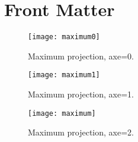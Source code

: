 \documentclass{InsightArticle}
\title{}
\author{}
\begin{document}
\maketitle

\ifhtml
\chapter*{Front Matter\label{front}}
\fi


\begin{abstract}
\noindent
\end{abstract}

\tableofcontents







\begin{figure}[htbp]
\centering
\texttt{[image: maximum0]}
\caption{Maximum projection, axe=0.}
\end{figure}

\begin{figure}[htbp]
\centering
\texttt{[image: maximum1]}
\caption{Maximum projection, axe=1.}
\end{figure}

\begin{figure}[htbp]
\centering
\texttt{[image: maximum]}
\caption{Maximum projection, axe=2.}
\end{figure}
\end{document}
